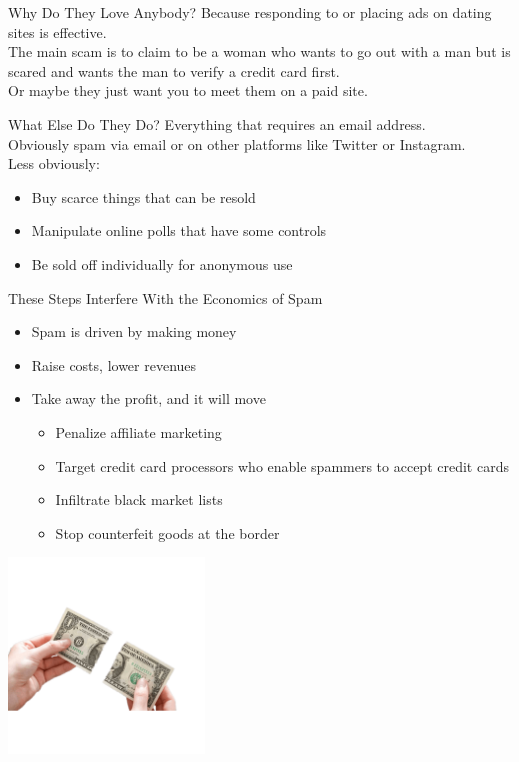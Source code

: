 \documentclass[nobackground,dvipsnames,table,aspectratio=169]{beamer}
\begin{document}
\begin{frame}{Why Do They Love Anybody?}
    Because responding to or placing ads on dating sites is effective.\\
    The main scam is to claim to be a woman who wants to go out with a man but is scared and wants the man to verify a credit card first.\\
    Or maybe they just want you to meet them on a paid site.
\end{frame}

\begin{frame}{What Else Do They Do?}
    Everything that requires an email address.\\
    Obviously spam via email or on other platforms like Twitter or Instagram.\\
    Less obviously:
    \begin{itemize}
        \item Buy scarce things that can be resold
        \item Manipulate online polls that have some controls
        \item Be sold off individually for anonymous use
    \end{itemize}
\end{frame}

\begin{frame}{These Steps Interfere With the Economics of Spam} %
    \begin{itemize}
        \item Spam is driven by making money
        \item Raise costs, lower revenues
        \item Take away the profit, and it will move
        \begin{itemize}
            \item Penalize affiliate marketing
            \item Target credit card processors who enable spammers to accept credit cards
            \item Infiltrate black market lists
            \item Stop counterfeit goods at the border
        \end{itemize}
    \end{itemize}
    \includegraphics[width=0.39\textwidth, left]{torn-dollar}
\end{frame}
\end{document}
